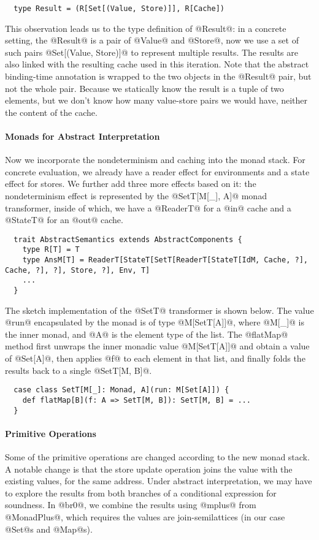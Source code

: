 \begin{lstlisting}
  type Result = (R[Set[(Value, Store)]], R[Cache])
\end{lstlisting}

This observation leads us to the type definition of @Result@: in a concrete setting,
the @Result@ is a pair of @Value@ and @Store@, now we use a set of such pairs
@Set[(Value, Store)]@ to represent multiple results. The results are also linked
with the resulting cache used in this iteration.
Note that the abstract binding-time annotation is wrapped to the two objects in
the @Result@ pair, but not the whole pair. Because we statically know the result
is a tuple of two elements, but we don't know how many value-store pairs we
would have, neither the content of the cache.

\paragraph{Monads for Abstract Interpretation} Now we incorporate the
nondeterminism and caching into the monad stack. For concrete evaluation, we
already have a reader effect for environments and a state effect for stores. We
further add three more effects based on it: the nondeterminism effect is
represented by the @SetT[M[_], A]@ monad transformer, inside of which, we have
a @ReaderT@ for a @in@ cache and a @StateT@ for an @out@ cache. 

\begin{lstlisting}
  trait AbstractSemantics extends AbstractComponents {
    type R[T] = T
    type AnsM[T] = ReaderT[StateT[SetT[ReaderT[StateT[IdM, Cache, ?], Cache, ?], ?], Store, ?], Env, T]
    ...
  }
\end{lstlisting}

The sketch implementation of the @SetT@ transformer is shown below. The value @run@
encapsulated by the monad is of type @M[SetT[A]]@, where @M[_]@ is the inner monad, and
@A@ is the element type of the list. The @flatMap@ method first unwraps the inner
monadic value @M[SetT[A]]@ and obtain a value of @Set[A]@, then applies @f@ to
each element in that list, and finally folds the results back to a single
@SetT[M, B]@.

\begin{lstlisting}
  case class SetT[M[_]: Monad, A](run: M[Set[A]]) {
    def flatMap[B](f: A => SetT[M, B]): SetT[M, B] = ...
  }
\end{lstlisting}

\paragraph{Primitive Operations} Some of the primitive operations are changed
according to the new monad stack. A notable change is that the store update
operation joins the value with the existing values, for the same address. Under
abstract interpretation, we may have to explore the results from both branches
of a conditional expression for soundness. In @br0@, we combine the results
using @mplus@ from @MonadPlus@, which requires the values are join-semilattices
(in our case @Set@s and @Map@s).


